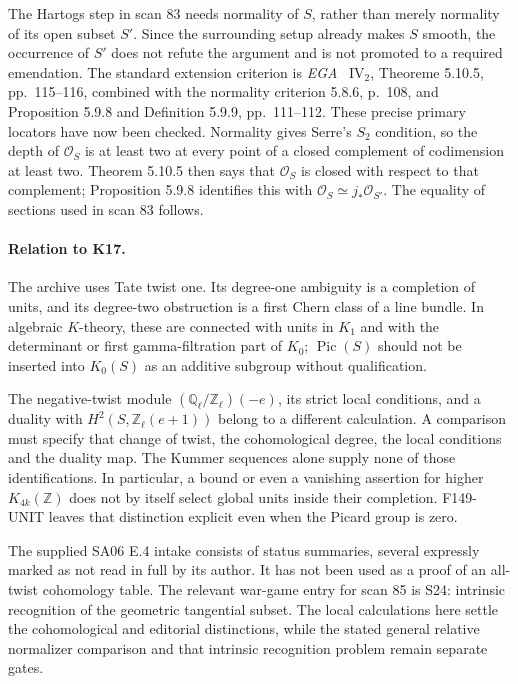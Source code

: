 \documentclass[11pt,a4paper]{article}
\theoremstyle{definition}
\begin{document}
The Hartogs step in scan 83 needs normality of \(S\), rather than
merely normality of its open subset \(S'\).  Since the surrounding
setup already makes \(S\) smooth, the occurrence of \(S'\) does not
refute the argument and is not promoted to a required emendation.
The standard extension criterion is \emph{EGA}~\cite{EGAIV2}
\(\mathrm{IV}_2\), Theoreme 5.10.5, pp.~115--116, combined with
the normality criterion 5.8.6, p.~108, and Proposition 5.9.8 and
Definition 5.9.9, pp.~111--112.  These precise primary locators have
now been checked.  Normality gives Serre's \(S_2\) condition, so
the depth of \(\mathcal O_S\) is at least two at every point of a
closed complement of codimension at least two.  Theorem 5.10.5
then says that \(\mathcal O_S\) is closed with respect to that
complement; Proposition 5.9.8 identifies this with
\(\mathcal O_S\simeq j_*\mathcal O_{S'}\).
The equality of sections used in scan 83 follows.

\paragraph{Relation to K17.}
The archive uses Tate twist one.  Its degree-one ambiguity is a
completion of units, and its degree-two obstruction is a first Chern
class of a line bundle.  In algebraic \(K\)-theory, these are connected
with units in \(K_1\) and with the determinant or first
gamma-filtration part of \(K_0\); \(\operatorname{Pic}(S)\) should
not be inserted into \(K_0(S)\) as an additive subgroup without
qualification.

The negative-twist module
\((\mathbb Q_\ell/\mathbb Z_\ell)(-e)\), its strict local conditions,
and a duality with \(H^2(S,\mathbb Z_\ell(e+1))\) belong to a
different calculation.  A comparison must specify that change of
twist, the cohomological degree, the local conditions and the duality
map.  The Kummer sequences alone supply none of those identifications.
In particular, a bound or even a vanishing assertion for higher
\(K_{4k}(\mathbb Z)\) does not by itself select global units inside
their completion.  F149-UNIT leaves that distinction explicit even
when the Picard group is zero.

The supplied SA06 E.4 intake consists of status summaries, several
expressly marked as not read in full by its author.  It has not been
used as a proof of an all-twist cohomology table.  The relevant
war-game entry for scan 85 is S24: intrinsic recognition of the
geometric tangential subset.  The local calculations here settle the
cohomological and editorial distinctions, while the stated general
relative normalizer comparison and that intrinsic recognition problem
remain separate gates.
\end{document}
